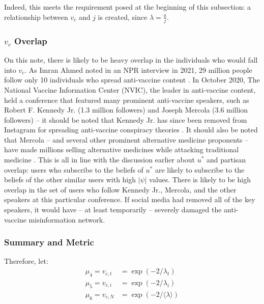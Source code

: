 \documentclass[preprint,review,12pt]{elsarticle}
\begin{document}
Indeed, this meets the requirement posed at the beginning of this subsection: a relationship between $v_c$ and $j$ is created, since $\lambda = \frac{a}{j}$.


\subsubsection{$v_c$ Overlap}
On this note, there is likely to be heavy overlap in the individuals who would fall into $v_c$. As Imran Ahmed noted in an NPR interview in 2021, 29 million people follow only 10 individuals who spread anti-vaccine content \cite{npr2021teachers,ahmed2020antivaxx}. In October 2020, The National Vaccine Information Center (NVIC), the leader in anti-vaccine content, held a conference that featured many prominent anti-vaccine speakers, such as Robert F. Kennedy Jr. (1.3 million followers) and Joseph Mercola (3.6 million followers) -- it should be noted that Kennedy Jr. has since been removed from Instagram for spreading anti-vaccine conspiracy theories \cite{robinson2021instagram}. It should also be noted that Mercola -- and several other prominent alternative medicine proponents -- have made millions selling alternative medicines while attacking traditional medicine \cite{satija2019major}. This is all in line with the discussion earlier about $u^*$ and partisan overlap: users who subscribe to the beliefs of $u^*$ are likely to subscribe to the beliefs of the other similar users with high $|\psi|$ values. There is likely to be high overlap in the set of users who follow Kennedy Jr., Mercola, and the other speakers at this particular conference. If social media had removed all of the key speakers, it would have -- at least temporarily -- severely damaged the anti-vaccine misinformation network. 


\subsubsection{Summary and Metric}

Therefore, let:
\begin{equation}
\label{mu_4 and mu_5}
\begin{split}
    \mu_4 = v_{c,t} & = \exp(-2/\lambda_{t}) \\
    \mu_5 = v_{c,i} & = \exp(-2/\lambda_{i}) \\
    \mu_6 = v_{c,N} & = \exp(-2/\langle \lambda \rangle)
\end{split}
\end{equation}
\end{document}
